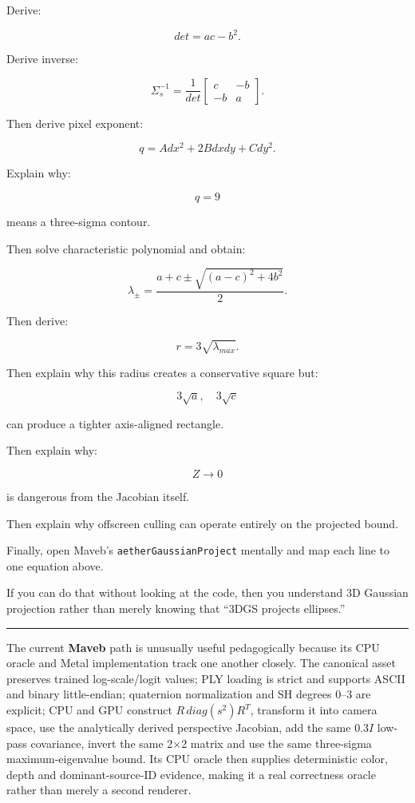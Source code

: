 Derive:

\[
det=
ac-b^2.
\]

Derive inverse:

\[
\Sigma_s^{-1}
=
\frac1{det}
\begin{bmatrix}
c&-b\\
-b&a
\end{bmatrix}.
\]

Then derive pixel exponent:

\[
q=
A dx^2+
2Bdxdy+
Cdy^2.
\]

Explain why:

\[
q=9
\]

means a three-sigma contour.

Then solve characteristic polynomial and obtain:

\[
\lambda_{\pm}
=
\frac{
a+c\pm
\sqrt{(a-c)^2+4b^2}
}{2}.
\]

Then derive:

\[
r=3\sqrt{\lambda_{max}}.
\]

Then explain why this radius creates a conservative square but:

\[
3\sqrt a,\quad3\sqrt c
\]

can produce a tighter axis-aligned rectangle.

Then explain why:

\[
Z\rightarrow0
\]

is dangerous from the Jacobian itself.

Then explain why offscreen culling can operate entirely on the projected bound.

Finally, open Maveb's \texttt{aetherGaussianProject} mentally and map each line to one equation above.

If you can do that without looking at the code, then you understand 3D Gaussian projection rather than merely knowing that ``3DGS projects ellipses.''

\begin{center}\rule{0.5\linewidth}{0.5pt}\end{center}

The current \textbf{Maveb} path is unusually useful pedagogically because its CPU oracle and Metal implementation track one another closely. The canonical asset preserves trained log-scale/logit values; PLY loading is strict and supports ASCII and binary little-endian; quaternion normalization and SH degrees 0--3 are explicit; CPU and GPU construct \(R\,diag(s^2)R^T\), transform it into camera space, use the analytically derived perspective Jacobian, add the same \(0.3I\) low-pass covariance, invert the same 2×2 matrix and use the same three-sigma maximum-eigenvalue bound. Its CPU oracle then supplies deterministic color, depth and dominant-source-ID evidence, making it a real correctness oracle rather than merely a second renderer.

